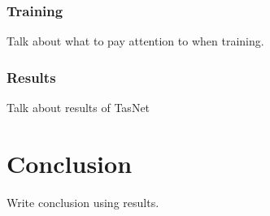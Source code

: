 \subsubsection{Training} %

Talk about what to pay attention to when training.

\subsubsection{Results}

Talk about results of TasNet


\section{Conclusion} %
\label{sec:conclusion}

Write conclusion using results.